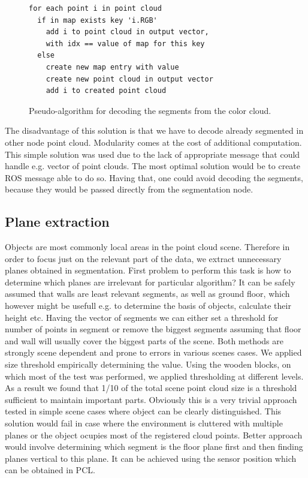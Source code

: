 \documentclass[12pt,oneside]{amsart}
\begin{document}
\begin{figure}[H]
\begin{center}
\begin{lstlisting}
for each point i in point cloud
  if in map exists key 'i.RGB'
    add i to point cloud in output vector,
    with idx == value of map for this key
  else
    create new map entry with value
    create new point cloud in output vector
    add i to created point cloud
\end{lstlisting}
\caption{Pseudo-algorithm for decoding the segments from the color cloud.}
\label{code:algo}
\end{center}
\end{figure}

The disadvantage of this solution is that we have to decode already segmented in other node point cloud. Modularity comes at the cost of additional computation. This simple solution was used due to the lack of appropriate message that could handle e.g. vector of point clouds. The most optimal solution would be to create ROS message able to do so. Having that, one could avoid decoding the segments, because they would be passed directly from the segmentation node.

\subsection{Plane extraction}
Objects are most commonly local areas in the point cloud scene. Therefore in order to focus just on the relevant part of the data, we extract unnecessary planes obtained in segmentation. First problem to perform this task is how to determine which planes are irrelevant for particular algorithm? It can be safely assumed that walls are least relevant segments, as well as ground floor, which however might be usefull e.g. to determine the basis of objects, calculate their height etc.
\newline
\indent Having the vector of segments we can either set a threshold for number of points in segment or remove the biggest segments assuming that floor and wall will usually cover the biggest parts of the scene. Both methods are strongly scene dependent and prone to errors in various scenes cases. We applied size threshold empirically determining the value. Using the wooden blocks, on which most of the test was performed, we applied thresholding at different levels. As a result we found that 1/10 of the total scene point cloud size is a	 threshold sufficient to maintain important parts.
\newline
\indent Obviously this is a very trivial approach tested in simple scene cases where object can be clearly distinguished. This solution would fail in case where the environment is cluttered with multiple planes or the object ocupies most of the registered cloud points. Better approach would involve determining which segment is the floor plane first and then finding planes vertical to this plane. It can be achieved using the sensor position which can be obtained in PCL. 
\end{document}
